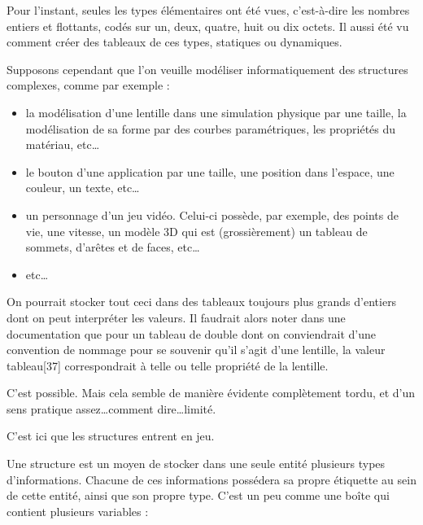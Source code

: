 \documentclass[../../../main.tex]{subfiles}
\begin{document}
Pour l'instant, seules les types élémentaires ont été vues, c'est-à-dire les nombres entiers et flottants, codés sur un, deux, quatre, huit ou dix octets. Il aussi été vu comment créer des tableaux de ces types, statiques ou dynamiques.
 
Supposons cependant que l'on veuille modéliser informatiquement des structures complexes, comme par exemple :
\begin{itemize}
	\item la modélisation d'une lentille dans une simulation physique par une taille, la modélisation de sa forme par des courbes paramétriques, les propriétés du matériau, etc\dots
	\item le bouton d'une application par une taille, une position dans l'espace, une couleur, un texte, etc\dots
	\item un personnage d'un jeu vidéo. Celui-ci possède, par exemple, des points de vie, une vitesse, un modèle 3D qui est (grossièrement) un tableau de sommets, d'arêtes et de faces, etc\dots
	\item etc\dots
\end{itemize}
On pourrait stocker tout ceci dans des tableaux toujours plus grands d'entiers dont on peut interpréter les valeurs. Il faudrait alors noter dans une documentation que pour un tableau de \textsf{double} dont on conviendrait d'une convention de nommage pour se souvenir qu'il s'agit d'une lentille, la valeur \textsf{tableau[37]} correspondrait à telle ou telle propriété de la lentille.
 
C'est possible. Mais cela semble de manière évidente complètement tordu, et d'un sens pratique assez\dots comment dire\dots limité.
 
C'est ici que les structures entrent en jeu.
 
Une structure est un moyen de stocker dans une seule entité plusieurs types d'informations. Chacune de ces informations possédera sa propre étiquette au sein de cette entité, ainsi que son propre type. C'est un peu comme une boîte qui contient plusieurs variables : 

\begin{minipage}{\textwidth}
	\begin{center}
		
	\end{center}
\end{minipage}
 
\end{document}
